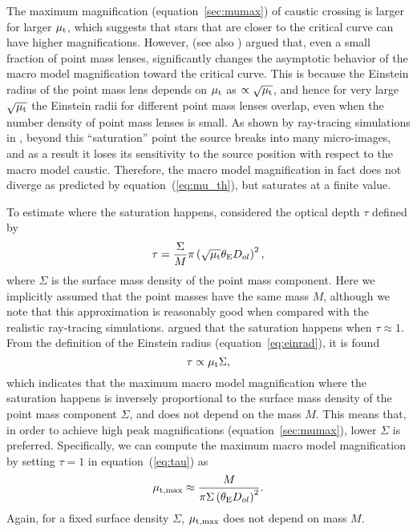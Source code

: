 \documentclass[showpacs,twocolumn,preprintnumbers,amsmath,amssymb,superscriptaddress,nofootinbib]{revtex4}
\begin{document}
The maximum magnification (equation~\ref{sec:mumax}) of caustic
crossing is larger for larger $\mu_{\rm t}$, which suggests that stars
that are closer to the critical curve can have higher magnifications. 
However, \cite{Diego:2017drh} (see also \cite{Venumadhav:2017pps})
argued that, even a small fraction of point mass lenses,
significantly changes the asymptotic behavior of the macro model
magnification toward the critical curve. This is because the Einstein
radius of the point mass lens depends on $\mu_{\rm t}$ as $\propto
\sqrt{\mu_{\rm t}}$, and hence for very large $\sqrt{\mu_{\rm t}}$
the Einstein radii for different point mass lenses overlap, even when
the number density of point mass lenses is small. As shown by
ray-tracing simulations in \cite{Diego:2017drh}, beyond this
``saturation'' point the source breaks into many micro-images, and as
a result it loses its sensitivity to the source position with respect
to the macro model caustic. Therefore, the macro model magnification
in fact does not diverge as predicted by equation~(\ref{eq:mu_th}),
but saturates at a finite value. 

To estimate where the saturation happens, \cite{Diego:2017drh}
considered the optical depth $\tau$ defined by
\begin{equation}
\tau=\frac{\Sigma}{M}\pi\left(\sqrt{\mu_{\rm t}}\theta_{\rm E}D_{ol}\right)^2,
\label{eq:tau}
\end{equation}
where $\Sigma$ is the surface mass density of the point mass
component. Here we implicitly assumed that the point masses have the
same mass $M$, although we note that this approximation is reasonably
good when compared with the realistic ray-tracing simulations.
\cite{Diego:2017drh} argued that the saturation happens
when $\tau \approx 1$. From the definition of the Einstein radius
(equation~\ref{eq:einrad}), it is found
\begin{equation}
\tau \propto \mu_{\rm t}\Sigma,
\end{equation}
which indicates that the maximum macro model magnification where the
saturation happens is inversely proportional to the surface mass
density of the point mass component $\Sigma$, and does not depend on
the mass $M$. This means that, in order to achieve high peak
magnifications (equation~\ref{sec:mumax}), lower $\Sigma$ is
preferred. Specifically, we can compute the maximum macro model
magnification by setting $\tau=1$ in equation~(\ref{eq:tau}) as
\begin{equation}
 \mu_{\rm t,max}\approx \frac{M}{\pi\Sigma\left(\theta_{\rm E}D_{ol}\right)^2}.
\label{eq:mutmax1}
\end{equation}
Again, for a fixed surface density $\Sigma$, $\mu_{\rm t,max}$ does
not depend on mass $M$.
\end{document}
